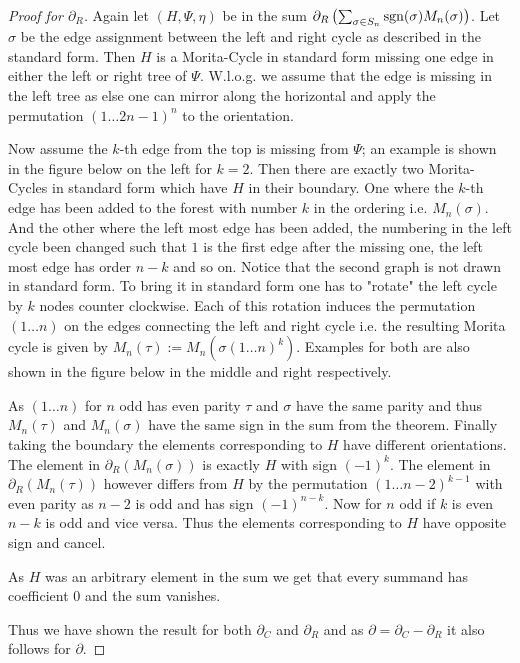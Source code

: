 \begin{proof}[Proof for $\partial_{R}$]
	Again let $(H,\Psi,\eta)$ be in the sum $\partial_{R}\left(\sum_{\sigma \in S_{n}} \operatorname{sgn}(\sigma) M_{n}(\sigma)\right)$.
	Let $\sigma$ be the edge assignment between the left and right cycle as described in the standard form.
	Then $H$ is a Morita-Cycle in standard form missing one edge in either the left or right tree of $\Psi$.
	W.l.o.g. we assume that the edge is missing in the left tree as else one can mirror along the horizontal
	and apply the permutation $(1 \ldots 2n-1)^{n}$ to the orientation.

	Now assume the $k$-th edge from the top is missing from $\Psi$; an example is shown in the figure below on the left for $k = 2$.
	Then there are exactly two Morita-Cycles in standard form which have $H$ in their boundary.
	One where the $k$-th edge has been added to the forest with number $k$ in the ordering i.e. $M_{n}(\sigma)$.
	And the other where the left most edge has been added, the numbering in the left cycle been changed such that $1$ is the first edge 
	after the missing one, the left most edge has order $n-k$ and so on.
	Notice that the second graph is not drawn in standard form. To bring it in standard form one has to "rotate" the left cycle
	by $k$ nodes counter clockwise. Each of this rotation induces the permutation $(1 \ldots n)$ on the edges connecting the left and right cycle i.e.
	the resulting Morita cycle is given by $M_{n}(\tau) := M_{n}(\sigma (1 \ldots n)^{k})$.
	Examples for both are also shown in the figure below in the middle and right respectively.
	
	As $(1 \ldots n)$ for $n$ odd has even parity $\tau$ and $\sigma$ have the same parity and thus $M_{n}(\tau)$ and $M_{n}(\sigma)$ have the same sign
	in the sum from the theorem. 
	Finally taking the boundary the elements corresponding to $H$ have different orientations.
	The element in $\partial_{R}(M_{n}(\sigma))$ is exactly $H$ with sign $(-1)^{k}$. The element in $\partial_{R}(M_{n}(\tau))$ however 
	differs from $H$ by the permutation $(1 \ldots n-2)^{k - 1}$ with even parity as $n-2$ is odd and has sign $(-1)^{n-k}$.
	Now for $n$ odd if $k$ is even $n-k$ is odd and vice versa. Thus the elements corresponding to $H$ have opposite sign and cancel.

	As $H$ was an arbitrary element in the sum we get that every summand has coefficient $0$ and the sum vanishes.


	Thus we have shown the result for both $\partial_{C}$ and $\partial_{R}$ and as $\partial = \partial_{C} - \partial_{R}$ it also follows for $\partial$.
\end{proof}

\newpage
\printbibliography

%


